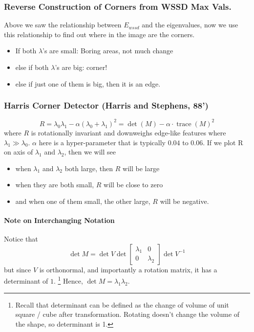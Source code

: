 \documentclass[11pt]{article}
\begin{document}
\subsubsection{Reverse Construction of Corners from WSSD Max Vals. }
Above we saw the relationship between $E_{wssd}$ and the eigenvalues, now we use this relationship to find out where in the image are the corners. 
\begin{itemize}
	\item If both $\lambda$'s are small: Boring areas, not much change
	\item else if both $\lambda$'s are big: corner!
	\item else if just one of them is big, then it is an edge. 
\end{itemize}

\subsubsection{Harris Corner Detector (Harris and Stephens, 88')} 
\begin{equation}
	R = \lambda_{0} \lambda_{1}-\alpha\left(\lambda_{0}+\lambda_{1}\right)^{2}=\operatorname{det}(M)-\alpha \cdot \operatorname{trace}(M)^{2}
\end{equation}
where $R$ is rotationally invariant and downweighs edge-like features where $\lambda_1 \gg \lambda_0$. $\alpha$ here is a hyper-parameter that is typically $0.04$ to $0.06$. If we plot R on axis of $\lambda_1$ and $\lambda_2$, then we will see 
\begin{itemize}
	\item when $\lambda_1$ and $\lambda_2$ both large, then $R$ will be large
	\item when they are both small, $R$ will be close to zero
	\item and when one of them small, the other large, $R$ will be negative. 
\end{itemize}

\paragraph{Note on Interchanging Notation} Notice that 
\begin{equation}
	\det M = \det V \det \begin{bmatrix}
		\lambda_1 & 0 \\
		0 & \lambda_2
	\end{bmatrix} \det V^{-1} 
\end{equation}
but since $V$ is orthonormal, and importantly a rotation matrix, it has a determinant of $1$. \footnote{Recall that determinant can be defined as the change of volume of unit square / cube after transformation. Rotating doesn't change the volume of the shape, so determinant is 1. } Hence, $\det M = \lambda_1\lambda_2$. 
\end{document}
